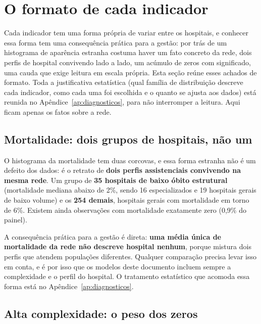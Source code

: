 \section{O formato de cada indicador}
\label{sec:distribuicoes}

Cada indicador tem uma forma própria de variar entre os hospitais, e
conhecer essa forma tem uma consequência prática para a gestão: por trás
de um histograma de aparência estranha costuma haver um fato concreto da
rede, dois perfis de hospital convivendo lado a lado, um acúmulo de
zeros com significado, uma cauda que exige leitura em escala própria.
Esta seção reúne esses achados de formato. Toda a justificativa
estatística (qual família de distribuição descreve cada indicador,
como cada uma foi escolhida e o quanto se ajusta aos dados) está
reunida no Apêndice~\ref{ap:diagnosticos}, para não interromper a
leitura. Aqui ficam apenas os fatos sobre a rede.

\subsection{Mortalidade: dois grupos de hospitais, não um}

O histograma da mortalidade tem duas corcovas, e essa forma estranha
não é um defeito dos dados: é o retrato de \textbf{dois perfis
assistenciais convivendo na mesma rede}. Um grupo de \textbf{35
hospitais de baixo óbito estrutural} (mortalidade mediana abaixo de
2\%, sendo 16 especializados e 19 hospitais gerais de baixo volume)
e os \textbf{254 demais}, hospitais gerais com mortalidade em torno de
6\%. Existem ainda observações com mortalidade exatamente zero (0,9\%
do painel).

A consequência prática para a gestão é direta: \textbf{uma média única
de mortalidade da rede não descreve hospital nenhum}, porque mistura
dois perfis que atendem populações diferentes. Qualquer comparação
precisa levar isso em conta, e é por isso que os modelos deste documento
incluem sempre a complexidade e o perfil do hospital. O tratamento
estatístico que acomoda essa forma está no
Apêndice~\ref{ap:diagnosticos}.


\subsection{Alta complexidade: o peso dos zeros}


